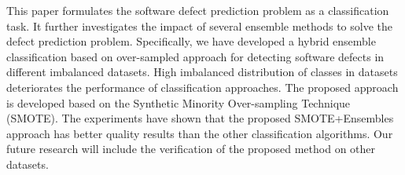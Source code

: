 \documentclass[runningheads,a4paper]{llncs}
\begin{document}
This paper formulates the software defect prediction problem as a classification task. It further investigates the impact of several
ensemble methods to solve the defect prediction problem. Specifically, we have developed a hybrid ensemble classification based on over-sampled approach for detecting software defects in different imbalanced datasets. High imbalanced distribution of classes in datasets deteriorates the performance of classification approaches. The proposed approach is developed based on the Synthetic Minority Over-sampling Technique (SMOTE). The experiments have shown that the proposed SMOTE+Ensembles approach has better quality results than the other classification algorithms. Our future research will include the verification of the proposed method on other datasets.








\end{document}
